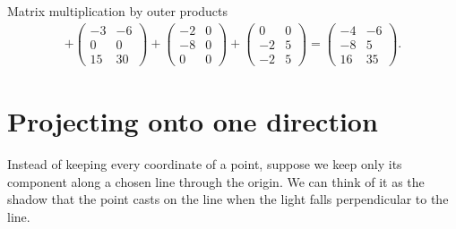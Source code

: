 \documentclass[a4paper,12pt,oneside]{report}
\begin{document}
\begin{framedexample}{Matrix multiplication by outer products}
{\begin{align*}
     +\begin{pmatrix}-3&-6\\0&0\\15&30\end{pmatrix}
     +\begin{pmatrix}-2&0\\-8&0\\0&0\end{pmatrix}
     +\begin{pmatrix}0&0\\-2&5\\-2&5\end{pmatrix}
     =\begin{pmatrix}-4&-6\\-8&5\\16&35\end{pmatrix}.
\end{align*}}
\end{framedexample}

\section{Projecting onto one direction}
\label{sec:projection-line}

Instead of keeping every coordinate of a point, suppose we keep
only its component along a chosen line through the origin. We can
think of it as the shadow that the point casts on the line when the
light falls perpendicular to the line.
\end{document}
